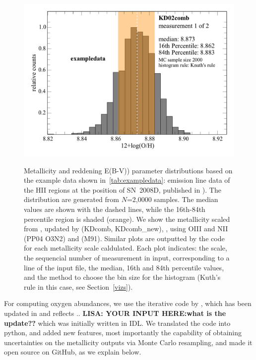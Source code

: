 \documentclass{emulateapj}
\begin{document}
\begin{figure}[!ht]
{\includegraphics[width=1.0\columnwidth]{exampledata_n2000_KD02comb_1.pdf}}
\caption{Metallicity and reddening E(B-V)) parameter distributions based on the example data shown in~\ref{tab:exampledata}: emission line data of the HII regions at the position of SN~2008D, published in \citet{modjaz11}). The distribution are generated from $N$=2,0000 samples. The median values are shown with the dashed lines, while the 16th-84th percentile region is shaded (orange). We show the metallicity scaled from \citet{kewley02}, updated by \citet{kewley08} (KDcomb, KDcomb\_new), \citet{pettini04}, using OIII and NII  (PP04 O3N2) and \citet{mcgaugh91} (M91). Similar plots are outputted by the code for each metallicity scale caldulated. Each plot indicates: the scale, the sequencial number of measurement in input, corresponding to a line of the input file, the median, 16th and 84th percentile values, and the method to choose the bin size for the histogram (Kuth's rule in this case, see Section~\ref{vizs}).}
 \label{metallicity_distribution}
\end{figure}


For computing oxygen abundances, we use the iterative code by \citet{kewley02}, which has been updated in \citet{kewley08} and reflects .. \textbf{LISA: YOUR INPUT HERE:what is the update??} which was initially written in IDL.  We translated the code into python, and added new features, most importantly the capability of obtaining uncertainties on the metallicity outputs via Monte Carlo resampling, and made it open source on GitHub, as we explain below.
\end{document}
